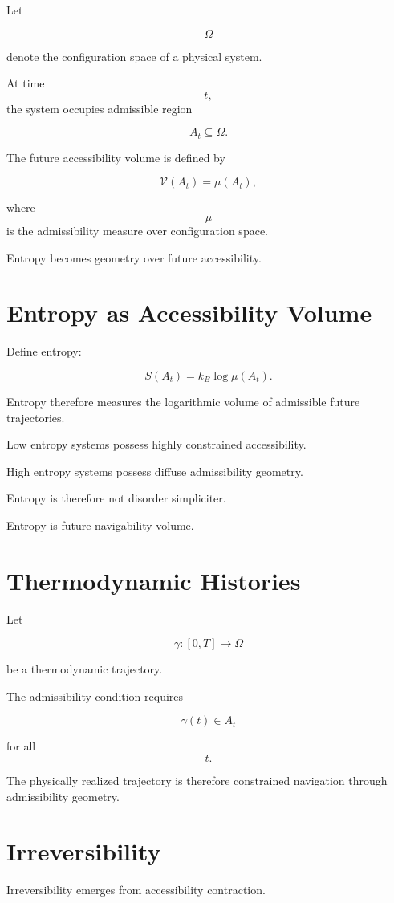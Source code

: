 \documentclass[12pt,openany]{book}
\theoremstyle{plain}
\theoremstyle{definition}
\theoremstyle{remark}
\begin{document}
Let

\[
\Omega
\]

denote the configuration space of a physical system.

At time
\[
t,
\]
the system occupies admissible region

\[
A_t
\subseteq
\Omega.
\]

The future accessibility volume is defined by

\[
\mathcal{V}(A_t)
=
\mu(A_t),
\]

where
\[
\mu
\]
is the admissibility measure over configuration space.

Entropy becomes geometry over future accessibility.

\section{Entropy as Accessibility Volume}

Define entropy:

\[
S(A_t)
=
k_B
\log \mu(A_t).
\]

Entropy therefore measures the logarithmic volume of admissible
future trajectories.

Low entropy systems possess highly constrained accessibility.

High entropy systems possess diffuse admissibility geometry.

Entropy is therefore not disorder simpliciter.

Entropy is future navigability volume.

\section{Thermodynamic Histories}

Let

\[
\gamma :
[0,T]\to\Omega
\]

be a thermodynamic trajectory.

The admissibility condition requires

\[
\gamma(t)
\in
A_t
\]

for all
\[
t.
\]

The physically realized trajectory is therefore constrained
navigation through admissibility geometry.

\section{Irreversibility}

Irreversibility emerges from accessibility contraction.
\end{document}
